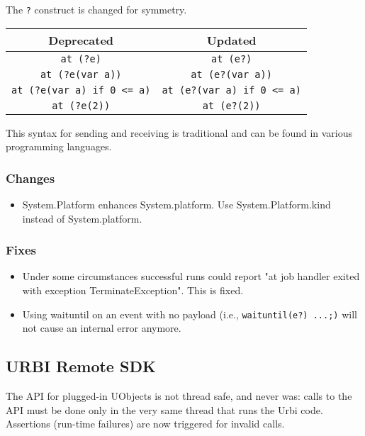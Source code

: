 The \lstinline|?| construct is changed for symmetry.

\begin{center}
  \begin{tabular}{|c|c|}
    \hline
    Deprecated & Updated \\
    \hline
   \lstinline|at (?e)|                  & \lstinline|at (e?)|\\
   \lstinline|at (?e(var a))|           & \lstinline|at (e?(var a))|\\
   \lstinline|at (?e(var a) if 0 <= a)| & \lstinline|at (e?(var a) if 0 <= a)|\\
   \lstinline|at (?e(2))|               & \lstinline|at (e?(2))|\\
 \end{tabular}
\end{center}

This syntax for sending and receiving is traditional and can be found
in various programming languages.

\subsubsection{Changes}

\begin{itemize}
\item System.Platform enhances System.platform.  Use
  System.Platform.kind instead of System.platform.
\end{itemize}

\subsubsection{Fixes}
\begin{itemize}
\item Under some circumstances successful runs could report "at job
  handler exited with exception TerminateException".  This is fixed.

\item Using waituntil on an event with no payload (i.e.,
  \lstinline|waituntil(e?) ...;)| will not cause an internal error
  anymore.
\end{itemize}

\subsection{URBI Remote SDK}

The API for plugged-in UObjects is not thread safe, and never was:
calls to the API must be done only in the very same thread that runs
the Urbi code.  Assertions (run-time failures) are now triggered for
invalid calls.

